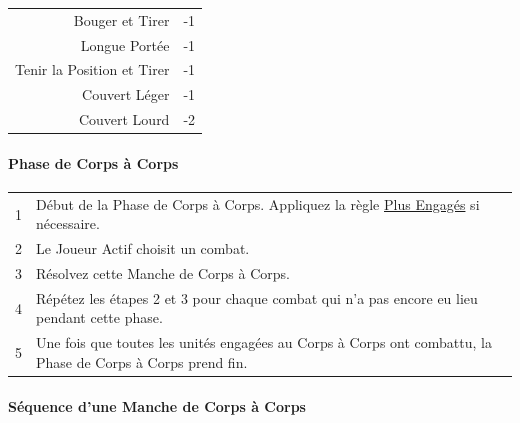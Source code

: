 {\begin{minipage}[t]{.29\linewidth}
\begin{center}
\begin{tabular}{rl}
\hline
Bouger et Tirer & -1 \tabularnewline
Longue Portée & -1 \tabularnewline
Tenir la Position et Tirer & -1 \tabularnewline
Couvert Léger & -1 \tabularnewline
Couvert Lourd & -2 \tabularnewline
\hline
\end{tabular}
\end{center}

\end{minipage}

\vspace*{20pt}
\def\svgwidth{\textwidth}


\newpage

\begin{multicols}{2}\raggedcolumns

\paragraph{Phase de Corps à Corps}

\begin{tabular}{c|p{7.4cm}}
1 & Début de la Phase de Corps à Corps. Appliquez la règle \hyperlink{nolongerengaged}{Plus Engagés} si nécessaire. \tabularnewline
2 & Le Joueur Actif choisit un combat. \tabularnewline
3 & Résolvez cette Manche de Corps à Corps. \tabularnewline
4 & Répétez les étapes 2 et 3 pour chaque combat qui n'a pas encore eu lieu pendant cette phase. \tabularnewline
5 & Une fois que toutes les unités engagées au Corps à Corps ont combattu, la Phase de Corps à Corps prend fin. \tabularnewline
\end{tabular}

\paragraph{Séquence d'une Manche de Corps à Corps}


\end{multicols}}
